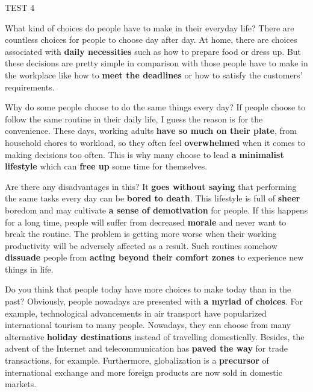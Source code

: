 \begin{glossarymc}[Cambridge 6]
\begin{test}{TEST 4}
    \begin{qa}{What kind of choices do people have to make in their everyday life?}
    There are countless choices for people to choose day after day. At home, there are choices associated with \textbf{daily necessities} such as how to prepare food or dress up. But these decisions are pretty simple in comparison with those people have to make in the workplace like how to \textbf{meet the deadlines} or how to satisfy the customers' requirements.
    \end{qa}

    \begin{qa}{Why do some people choose to do the same things every day?}
    If people choose to follow the same routine in their daily life, I guess the reason is for the convenience. These days, working adults \textbf{have so much on their plate}, from household chores to workload, so they often feel \textbf{overwhelmed} when it comes to making decisions too often. This is why many choose to lead \textbf{a minimalist lifestyle} which can \textbf{free up} some time for themselves.
    \end{qa}

    \begin{qa}{Are there any disadvantages in this?}
    It \textbf{goes without saying} that performing the same tasks every day can be \textbf{bored to death}. This lifestyle is full of \textbf{sheer} boredom and may cultivate \textbf{a sense of demotivation} for people. If this happens for a long time, people will suffer from decreased \textbf{morale} and never want to break the routine. The problem is getting more worse when their working productivity will be adversely affected as a result. Such routines somehow \textbf{dissuade} people from \textbf{acting beyond their comfort zones} to experience new things in life.
    \end{qa}

    \begin{qa}{Do you think that people today have more choices to make today than in the past?}
    Obviously, people nowadays are presented with \textbf{a myriad of choices}. For example, technological advancements in air transport have popularized international tourism to many people. Nowadays, they can choose from many alternative \textbf{holiday destinations} instead of travelling domestically. Besides, the advent of the Internet and telecommunication has \textbf{paved the way} for trade transactions, for example. Furthermore, globalization is a \textbf{precursor} of international exchange and more foreign products are now sold in domestic markets.
    \end{qa}


\end{test}
\end{glossarymc}
